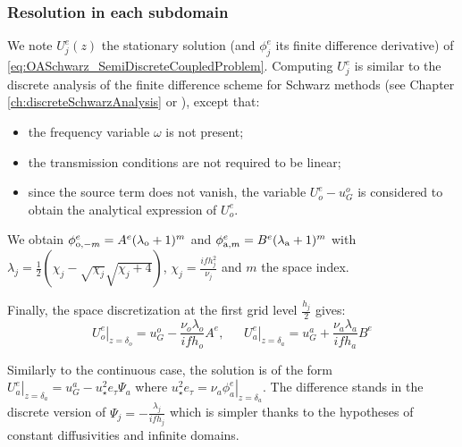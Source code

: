 \subsubsection{Resolution in each subdomain}
\label{sec:OASchwarz_SteadyStateInner}
We note $U_j^e(z)$ the stationary solution (and ${\phi}_j^e$ its finite difference derivative) of
\eqref{eq:OASchwarz_SemiDiscreteCoupledProblem}.
Computing $U_j^e$ is similar
to the discrete analysis of the finite difference scheme for
Schwarz methods (see Chapter \ref{ch:discreteSchwarzAnalysis} or
\citep{wu_optimized_2017}),
except that:
\begin{itemize}
	\item the frequency variable $\omega$ is not present;
	\item the transmission conditions are not required to
		be linear;
	\item since the source term does not vanish,
		the variable $U^e_o - u_G^o$ is considered
		to obtain the analytical expression of $U^e_o$.
\end{itemize}
We obtain
$\phi_{{\rm o}, -m}^e = A^e
(\lambda_{\rm o}+1)^m$
and
$\phi_{{\rm a}, m}^e = B^e
(\lambda_{\rm a}+1)^m$ 
with $\lambda_j = \frac{1}{2}\left(\chi_j - \sqrt{\chi_j} \sqrt{\chi_j + 4}\right)$, 
$\chi_j=\frac{i f h_j^2}{\nu_j}$
and $m$ the space index.
\par
Finally, the space discretization at the first grid level
$\frac{h_j}{2}$ gives:
\begin{equation}
		\left.{U}^e_o\right|_{z=\delta_o} =
u_G^o - \frac{\nu_o\lambda_o}{if h_o} A^e, ~~~~~~~
		\left.{U}^e_a\right|_{z=\delta_a} =
u_G^a + \frac{\nu_a\lambda_a}{if h_a} B^e
\end{equation}
\begin{remark}
Similarly to the continuous case, the solution is of the form
	$\left.{U}^e_a\right|_{z=\delta_a} = u_G^a -
	u_\star^2 e_{\tau}\Psi_a$
	where $u_\star^2 e_{\tau} =
	\left.\nu_a \phi_a^e\right|_{z=\delta_a}$.
The difference stands in the discrete version of
$\Psi_j = -\frac{\lambda_j}{if h_j}$
which is simpler thanks to the hypotheses of constant diffusivities
and infinite domains.
\end{remark}

